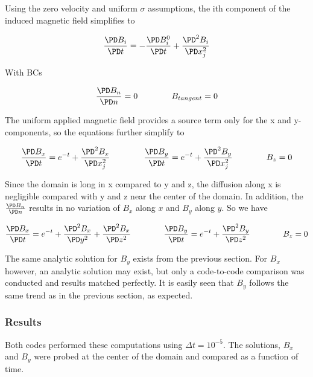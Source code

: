 \documentclass[11pt]{article}
\begin{document}
Using the zero velocity and uniform $\sigma$ assumptions, the ith component of the induced magnetic field simplifies to

\begin{equation}
	\frac{\PD B_i}{\PD t}
	=
	-
	\frac{\PD B_i^0}{\PD t}
	+
	\frac{\PD^2 B_i}{\PD x_j^2}
\end{equation}

With BCs

\begin{equation}
	\frac{\PD B_{n}}{\PD n} = 0
	\qquad \qquad
	B_{tangent} = 0
\end{equation}

The uniform applied magnetic field provides a source term only for the x and y-components, so the equations further simplify to

\begin{equation}
	\frac{\PD B_x}{\PD t}
	=
	e^{-t}
	+
	\frac{\PD^2 B_x}{\PD x_j^2}
	\qquad \qquad
	\frac{\PD B_y}{\PD t}
	=
	e^{-t}
	+
	\frac{\PD^2 B_y}{\PD x_j^2}
	\qquad \qquad
	B_z = 0
\end{equation}

Since the domain is long in x compared to y and z, the diffusion along x is negligible compared with y and z near the center of the domain. In addition, the $\frac{\PD B_n}{\PD n}$ results in no variation of $B_x$ along $x$ and $B_y$ along $y$. So we have

\begin{equation}
	\frac{\PD B_x}{\PD t}
	=
	e^{-t}
	+
	\frac{\PD^2 B_x}{\PD y^2}
	+
	\frac{\PD^2 B_x}{\PD z^2}
	\qquad \qquad
	\frac{\PD B_y}{\PD t}
	=
	e^{-t}
	+
	\frac{\PD^2 B_y}{\PD z^2}
	\qquad \qquad
	B_z = 0
\end{equation}

The same analytic solution for $B_y$ exists from the previous section. For $B_x$ however, an analytic solution may exist, but only a code-to-code comparison was conducted and results matched perfectly. It is easily seen that $B_y$ follows the same trend as in the previous section, as expected.

\subsubsection{Results}
Both codes performed these computations using $\Delta t = 10^{-5}$. The solutions, $B_x$ and $B_y$ were probed at the center of the domain and compared as a function of time.

\end{document}
